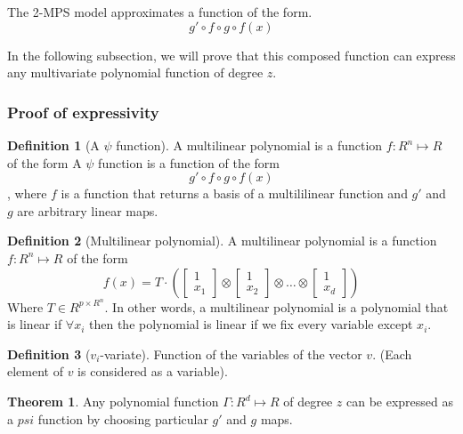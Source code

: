 \documentclass{article}
\theoremstyle{definition}
\newtheorem{definition}{Definition}[section]
\newtheorem{theorem}{Theorem}[section]
\theoremstyle{definition}
\begin{document}
The 2-MPS model approximates a function of the form.
\[  
    g' \circ f \circ g \circ f (x)
\]

In the following subsection, we will prove that this composed function can express
any multivariate polynomial function of degree $z$.

\subsubsection{Proof of expressivity}

\begin{definition}[A $\psi$ function]
    A multilinear polynomial is a function $f: R^n \mapsto R$ of the form
    A $\psi$ function is a function of the form
    \[  g' \circ f \circ g \circ f (x) \],
    where $f$ is a function that returns a basis of a multililinear function and 
    $g'$ and $g$ are arbitrary linear maps.
\end{definition}


\begin{definition}[Multilinear polynomial]
    A multilinear polynomial is a function $f: R^n \mapsto R$ of the form
    \begin{equation}
        f(x) = T \cdot \left( 
            \begin{bmatrix} 1 \\ x_1 \end{bmatrix} \otimes 
            \begin{bmatrix} 1 \\ x_2 \end{bmatrix} \otimes 
            \dots \otimes 
            \begin{bmatrix} 1 \\ x_d \end{bmatrix}
        \right)
    \end{equation}
    Where $T \in R^{p \times R^n }$. In other words, a multilinear polynomial is a polynomial that is linear if  $\forall x_i$ then the polynomial is linear if we fix every variable except $x_i$.
\end{definition}

\begin{definition}[$v_i$-variate]
Function of the variables of the vector $v$. (Each element of $v$ is considered as a variable).
\end{definition}


\begin{theorem}
    Any polynomial function $\Gamma: R^d \mapsto R$ of degree $z$ can be expressed as
    a $psi$ function by choosing particular $g'$ and $g$ maps.
\end{theorem}
\end{document}
